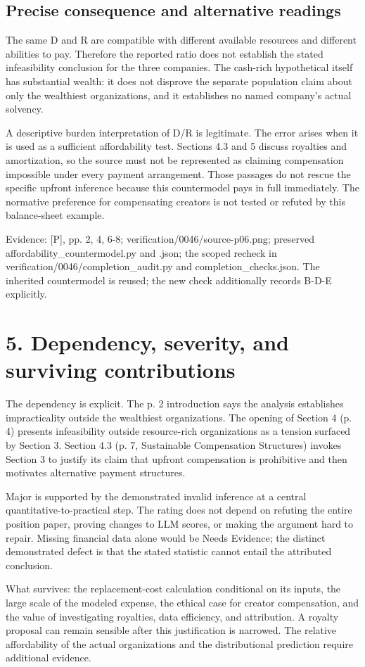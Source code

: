 \documentclass[10pt]{article}
\begin{document}
\subsection*{Precise consequence and alternative readings}
The same D and R are compatible with different available resources and different abilities to pay. Therefore the reported ratio does not establish the stated infeasibility conclusion for the three companies. The cash-rich hypothetical itself has substantial wealth: it does not disprove the separate population claim about only the wealthiest organizations, and it establishes no named company’s actual solvency.\par
A descriptive burden interpretation of D/R is legitimate. The error arises when it is used as a sufficient affordability test. Sections 4.3 and 5 discuss royalties and amortization, so the source must not be represented as claiming compensation impossible under every payment arrangement. Those passages do not rescue the specific upfront inference because this countermodel pays in full immediately. The normative preference for compensating creators is not tested or refuted by this balance-sheet example.\par
Evidence: [P], pp. 2, 4, 6-8; verification/0046/source-p06.png; preserved affordability\_countermodel.py and .json; the scoped recheck in verification/0046/completion\_audit.py and completion\_checks.json. The inherited countermodel is reused; the new check additionally records B-D-E explicitly.\par
\section*{5. Dependency, severity, and surviving contributions}
The dependency is explicit. The p. 2 introduction says the analysis establishes impracticality outside the wealthiest organizations. The opening of Section 4 (p. 4) presents infeasibility outside resource-rich organizations as a tension surfaced by Section 3. Section 4.3 (p. 7, Sustainable Compensation Structures) invokes Section 3 to justify its claim that upfront compensation is prohibitive and then motivates alternative payment structures.\par
Major is supported by the demonstrated invalid inference at a central quantitative-to-practical step. The rating does not depend on refuting the entire position paper, proving changes to LLM scores, or making the argument hard to repair. Missing financial data alone would be Needs Evidence; the distinct demonstrated defect is that the stated statistic cannot entail the attributed conclusion.\par
What survives: the replacement-cost calculation conditional on its inputs, the large scale of the modeled expense, the ethical case for creator compensation, and the value of investigating royalties, data efficiency, and attribution. A royalty proposal can remain sensible after this justification is narrowed. The relative affordability of the actual organizations and the distributional prediction require additional evidence.\par
\end{document}
